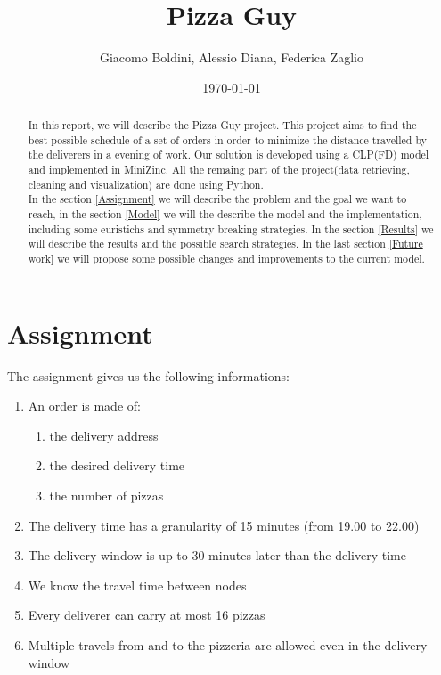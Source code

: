 \documentclass[10pt]{article}
\title{Pizza Guy}
\date{\today}
\author{Giacomo Boldini, Alessio Diana, Federica Zaglio}
\begin{document}
	\maketitle

	\begin{abstract}

		In this report, we will describe the Pizza Guy project. This project 
		aims to find the best possible schedule of a set of orders in order to
		minimize the distance travelled by the deliverers in a evening of 
		work. Our solution is developed using a CLP(FD) model and implemented 
		in MiniZinc. All the remaing part of the project(data retrieving, cleaning
		and visualization) are done using Python.\\	
		In the section \ref{Assignment} we will describe the problem and the goal
		we want to reach, in the section \ref{Model} we will the describe the 
		model and the implementation, including some euristichs and symmetry breaking
		strategies. In the section \ref{Results} we will describe the results and
		the possible search strategies. In the last section \ref{Future work} we 
		will propose some possible changes and improvements to the current model.
		
	\end{abstract}

	\tableofcontents

	\section{Assignment}
	\label{Assignment}
	
	The assignment gives us the following informations:
	\begin{enumerate}
		\item An order is made of:
		\begin{enumerate}
			\item the delivery address
			\item the desired delivery time
			\item the number of pizzas
		\end{enumerate}
		\item The delivery time has a granularity of 15 minutes (from 
			19.00 to 22.00)
		\item The delivery window is up to 30 minutes later than the delivery 
			time
		\item We know the travel time between nodes
		\item Every deliverer can carry at most 16 pizzas
		\item Multiple travels from and to the pizzeria are allowed even in the 
			delivery window
	\end{enumerate}
\end{document}

